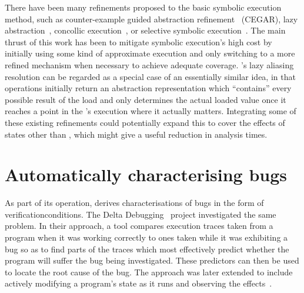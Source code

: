 There have been many refinements proposed to the basic symbolic
execution method, such as counter-example guided abstraction
refinement~\cite{Clarke2003} (CEGAR), lazy
abstraction~\cite{Henzinger2002}, concollic execution~\cite{Sen2005},
or selective symbolic execution~\cite{Chipounov2011}.  The main thrust
of this work has been to mitigate symbolic execution's high cost by
initially using some kind of approximate execution and only switching
to a more refined mechanism when necessary to achieve adequate
coverage.  {\Technique}'s lazy aliasing resolution can be regarded as
a special case of an essentially similar idea, in that 
operations initially return an abstraction representation which
``contains'' every possible result of the load and {\technique} only
determines the actual loaded value once it reaches a point in the
{\StateMachine}'s execution where it actually matters.  Integrating
some of these existing refinements could potentially expand this to
cover the effects of states other than , which might give
a useful reduction in analysis times.

\section{Automatically characterising bugs}
\label{sect:rw:auto_characterise}

As part of its operation, {\technique} derives characterisations of
bugs in the form of \glspl{verificationcondition}.  The Delta
Debugging~\cite{Cleve2005} project investigated the same problem.  In
their approach, a tool compares execution traces taken from a program
when it was working correctly to ones taken while it was exhibiting a
bug so as to find parts of the traces which most effectively predict
whether the program will suffer the bug being investigated.  These
predictors can then be used to locate the root cause of the bug.  The
approach was later extended to include actively modifying a program's
state as it runs and observing the effects~\cite{Jeffrey2009}.

